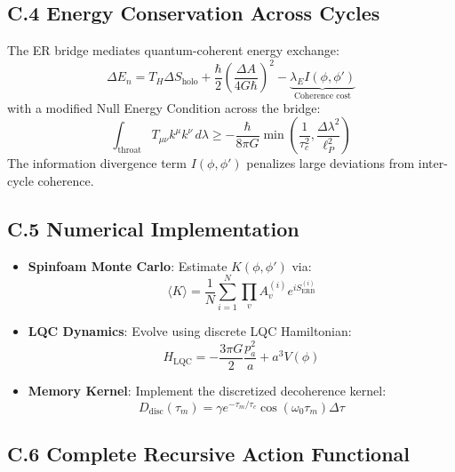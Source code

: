 \subsection*{C.4 Energy Conservation Across Cycles}

The ER bridge mediates quantum-coherent energy exchange:
\begin{equation}
\Delta E_n = T_H\Delta S_{\text{holo}} + \frac{\hbar}{2}\left(\frac{\Delta A}{4G\hbar}\right)^2 - \underbrace{\lambda_E I(\phi,\phi')}_{\text{Coherence cost}}
\end{equation}
with a modified Null Energy Condition across the bridge:
\begin{equation}
\int_{\text{throat}} T_{\mu\nu}k^\mu k^\nu \, d\lambda \geq -\frac{\hbar}{8\pi G} \min\left(\frac{1}{\tau_c^2},\frac{\Delta\lambda^2}{\ell_P^2}\right)
\end{equation}
The information divergence term $I(\phi,\phi')$ penalizes large deviations from inter-cycle coherence.

\subsection*{C.5 Numerical Implementation}

\begin{itemize}
  \item \textbf{Spinfoam Monte Carlo}: Estimate $K(\phi,\phi')$ via:
  \begin{equation}
  \langle K \rangle = \frac{1}{N}\sum_{i=1}^N \prod_v A_v^{(i)} e^{iS_{\text{ERB}}^{(i)}}
  \end{equation}

  \item \textbf{LQC Dynamics}: Evolve using discrete LQC Hamiltonian:
  \begin{equation}
  H_{\text{LQC}} = -\frac{3\pi G}{2} \frac{p_a^2}{a} + a^3 V(\phi)
  \end{equation}

  \item \textbf{Memory Kernel}: Implement the discretized decoherence kernel:
  \begin{equation}
  D_{\text{disc}}(\tau_m) = \gamma e^{-\tau_m/\tau_c}\cos(\omega_0\tau_m)\Delta\tau
  \end{equation}
\end{itemize}

\subsection*{C.6 Complete Recursive Action Functional}

